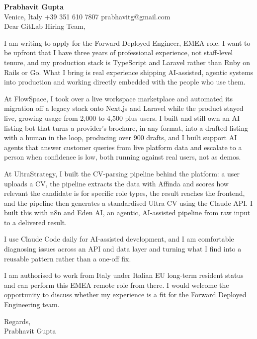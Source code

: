 \documentclass[a4paper,10.5pt]{article}
\begin{document}
\textbf{Prabhavit Gupta}\\
Venice, Italy \textbar{} +39 351 610 7807 \textbar{} prabhavitg@gmail.com\\[10pt]
Dear GitLab Hiring Team,

I am writing to apply for the Forward Deployed Engineer, EMEA role. I want to be upfront that I have three years of professional experience, not staff-level tenure, and my production stack is TypeScript and Laravel rather than Ruby on Rails or Go. What I bring is real experience shipping AI-assisted, agentic systems into production and working directly embedded with the people who use them.

At FlowSpace, I took over a live workspace marketplace and automated its migration off a legacy stack onto Next.js and Laravel while the product stayed live, growing usage from 2,000 to 4,500 plus users. I built and still own an AI listing bot that turns a provider's brochure, in any format, into a drafted listing with a human in the loop, producing over 900 drafts, and I built support AI agents that answer customer queries from live platform data and escalate to a person when confidence is low, both running against real users, not as demos.

At UltraStrategy, I built the CV-parsing pipeline behind the platform: a user uploads a CV, the pipeline extracts the data with Affinda and scores how relevant the candidate is for specific role types, the result reaches the frontend, and the pipeline then generates a standardised Ultra CV using the Claude API. I built this with n8n and Eden AI, an agentic, AI-assisted pipeline from raw input to a delivered result.

I use Claude Code daily for AI-assisted development, and I am comfortable diagnosing issues across an API and data layer and turning what I find into a reusable pattern rather than a one-off fix.

I am authorised to work from Italy under Italian EU long-term resident status and can perform this EMEA remote role from there. I would welcome the opportunity to discuss whether my experience is a fit for the Forward Deployed Engineering team.

Regards,\\
Prabhavit Gupta
\end{document}
